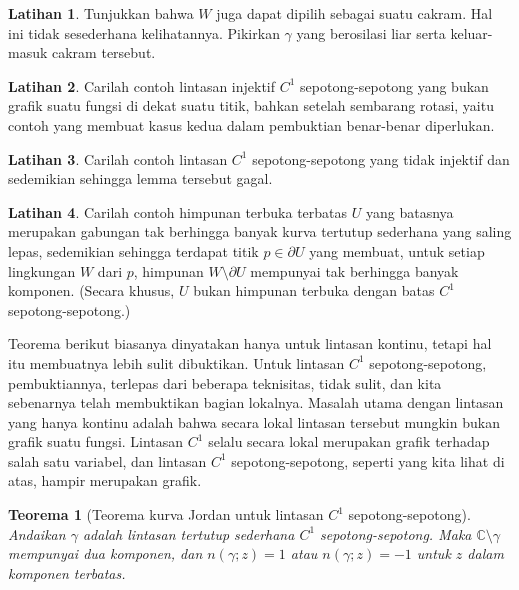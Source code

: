 \documentclass[12pt,openany]{book}
\newcommand{\C}{{\mathbb{C}}}
\theoremstyle{plain}
\newtheorem{thm}{Teorema}[section]
\theoremstyle{remark}
\theoremstyle{definition}
\newenvironment{exbox}{%
    \def\FrameCommand{\vrule width 1pt \relax\hspace{10pt}}%
    \MakeFramed{\advance\hsize-\width\FrameRestore}%
}{%
    \endMakeFramed
}
\theoremstyle{exercise}
\newtheorem{exercise}{Latihan}[section]
\theoremstyle{example}
\begin{document}
\begin{exbox}
\begin{exercise}
Tunjukkan bahwa $W$ juga dapat dipilih sebagai suatu cakram.
Hal ini tidak sesederhana kelihatannya.
Pikirkan $\gamma$ yang berosilasi liar serta keluar-masuk cakram tersebut.
\end{exercise}

\begin{exercise}
Carilah contoh lintasan injektif $C^1$ sepotong-sepotong yang bukan grafik suatu
fungsi di dekat suatu titik, bahkan setelah sembarang rotasi,
yaitu contoh yang membuat kasus kedua dalam
pembuktian benar-benar diperlukan.
\end{exercise}

\begin{exercise}
Carilah contoh lintasan $C^1$ sepotong-sepotong yang tidak injektif dan sedemikian sehingga
lemma tersebut gagal.
\end{exercise}

\begin{exercise}
Carilah contoh himpunan terbuka terbatas $U$ yang batasnya merupakan gabungan
tak berhingga banyak kurva tertutup sederhana yang saling lepas, sedemikian sehingga terdapat titik
$p \in \partial U$ yang membuat, untuk setiap lingkungan $W$ dari $p$,
himpunan $W \setminus \partial U$ mempunyai tak berhingga banyak komponen.
(Secara khusus, $U$ bukan himpunan terbuka dengan batas $C^1$ sepotong-sepotong.)
\end{exercise}
\end{exbox}

Teorema berikut biasanya dinyatakan hanya untuk lintasan kontinu, tetapi hal itu membuatnya
lebih sulit dibuktikan. Untuk lintasan $C^1$ sepotong-sepotong, pembuktiannya, terlepas dari beberapa
teknisitas, tidak sulit, dan kita sebenarnya telah membuktikan
bagian lokalnya. Masalah utama dengan lintasan yang hanya kontinu adalah bahwa
secara lokal lintasan tersebut mungkin bukan grafik suatu fungsi. Lintasan $C^1$ selalu
secara lokal merupakan grafik terhadap salah satu variabel, dan lintasan $C^1$
sepotong-sepotong, seperti yang kita lihat di atas, hampir merupakan grafik.

\begin{thm}[Teorema kurva Jordan untuk lintasan $C^1$ sepotong-sepotong]%
Andaikan $\gamma$ adalah lintasan tertutup sederhana $C^1$ sepotong-sepotong.
Maka $\C \setminus \gamma$ mempunyai dua komponen,
dan $n(\gamma;z) = 1$ atau 
$n(\gamma;z) = -1$ untuk $z$ dalam komponen terbatas.
\end{thm}
\end{document}
